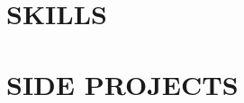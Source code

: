 \documentclass[10.5pt,letterpaper]{article}
\begin{document}
\section{\faDatabase{ }SKILLS}
\vspace{4pt}

\vspace{-20pt}

\section{\faFolderOpen{ }SIDE PROJECTS}
\vspace{4pt}


\end{document}
